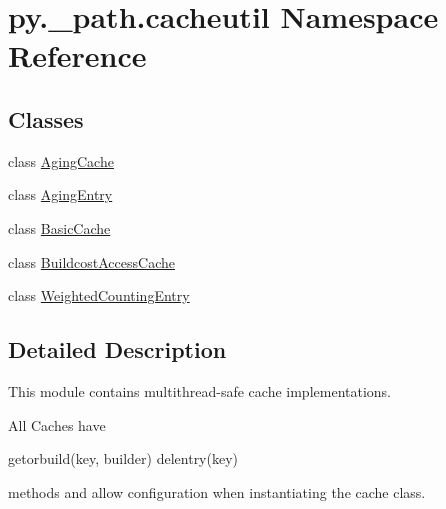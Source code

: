 \hypertarget{namespacepy_1_1__path_1_1cacheutil}{}\section{py.\+\_\+path.\+cacheutil Namespace Reference}
\label{namespacepy_1_1__path_1_1cacheutil}
\subsection*{Classes}
\begin{DoxyCompactItemize}
\item 
class \hyperlink{classpy_1_1__path_1_1cacheutil_1_1_aging_cache}{Aging\+Cache}
\item 
class \hyperlink{classpy_1_1__path_1_1cacheutil_1_1_aging_entry}{Aging\+Entry}
\item 
class \hyperlink{classpy_1_1__path_1_1cacheutil_1_1_basic_cache}{Basic\+Cache}
\item 
class \hyperlink{classpy_1_1__path_1_1cacheutil_1_1_buildcost_access_cache}{Buildcost\+Access\+Cache}
\item 
class \hyperlink{classpy_1_1__path_1_1cacheutil_1_1_weighted_counting_entry}{Weighted\+Counting\+Entry}
\end{DoxyCompactItemize}


\subsection{Detailed Description}
\begin{DoxyVerb}This module contains multithread-safe cache implementations.

All Caches have

    getorbuild(key, builder)
    delentry(key)

methods and allow configuration when instantiating the cache class.
\end{DoxyVerb}
 